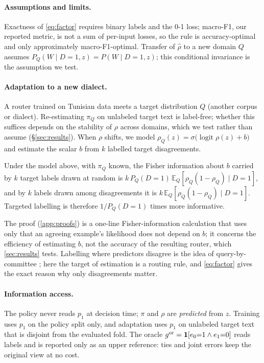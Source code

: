 \paragraph{Assumptions and limits.}
Exactness of \cref{eq:factor} requires binary labels and the 0-1 loss; macro-F1, our reported metric, is not a sum of per-input losses, so the rule is accuracy-optimal and only approximately macro-F1-optimal. Transfer of $\hat\rho$ to a new domain $Q$ assumes $P_Q(W\mid D{=}1,z)=P(W\mid D{=}1,z)$; this conditional invariance is the assumption we test.

\paragraph{Adaptation to a new dialect.}
A router trained on Tunisian data meets a target distribution $Q$ (another corpus or dialect). Re-estimating $\pi_Q$ on unlabeled target text is label-free; whether this suffices depends on the stability of $\rho$ across domains, which we test rather than assume (\S\ref{sec:results}).
When $\rho$ shifts, we model $\rho_Q(z)=\sigma\big(\operatorname{logit}\rho(z)+b\big)$ and estimate the scalar $b$ from $k$ labelled target disagreements.

\begin{proposition}
\label{prop:efficiency}
Under the model above, with $\pi_Q$ known, the Fisher information about $b$ carried by $k$ target labels drawn at random is $k\,P_Q(D{=}1)\,\mathbb E_Q[\rho_Q(1-\rho_Q)\mid D{=}1]$, and by $k$ labels drawn among disagreements it is $k\,\mathbb E_Q[\rho_Q(1-\rho_Q)\mid D{=}1]$. Targeted labelling is therefore $1/P_Q(D{=}1)$ times more informative.
\end{proposition}
The proof (\cref{app:proofs}) is a one-line Fisher-information calculation that uses only that an agreeing example's likelihood does not depend on $b$; it concerns the efficiency of estimating $b$, not the accuracy of the resulting router, which \cref{sec:results} tests. Labelling where predictors disagree is the idea of query-by-committee \citep{seung1992qbc}; here the target of estimation is a routing rule, and \cref{eq:factor} gives the exact reason why only disagreements matter.

\paragraph{Information access.}
The policy never reads $p_1$ at decision time; $\pi$ and $\rho$ are \emph{predicted} from $z$. Training uses $p_1$ on the policy split only, and adaptation uses $p_1$ on unlabeled target text that is disjoint from the evaluated fold. The oracle $g^{\rm or}=\mathbf 1[e_0{=}1\wedge e_1{=}0]$ reads labels and is reported only as an upper reference: ties and joint errors keep the original view at no cost.
